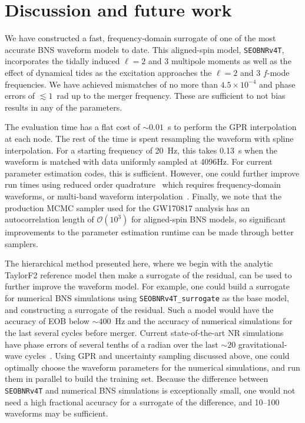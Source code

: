 \documentclass[prd,aps,letter,twocolumn,floatfix,notitlepage,nofootinbib]{revtex4-1}
\begin{document}
\section{Discussion and future work}
\label{sec:discussion}

We have constructed a fast, frequency-domain surrogate of one of the most accurate BNS waveform models to date. This aligned-spin model, \texttt{SEOBNRv4T}, incorporates the tidally induced $\ell=2$ and 3 multipole moments as well as the effect of dynamical tides as the excitation approaches the $\ell=2$ and 3 $f$-mode frequencies. We have achieved mismatches of no more than $4.5 \times 10^{-4}$ and phase errors of $\lesssim 1$~rad up to the merger frequency. These are sufficient to not bias results in any of the parameters.

The evaluation time has a flat cost of $\sim 0.01$~s to perform the GPR interpolation at each node. The rest of the time is spent resampling the waveform with spline interpolation. For a starting frequency of 20~Hz, this takes 0.13~s when the waveform is matched with data uniformly sampled at 4096Hz. For current parameter estimation codes, this is sufficient. However, one could further improve run times using reduced order quadrature~\cite{Antil2013, CanizaresFieldGair2013, CanizaresFieldGair2015, Smith:2016qas} which requires frequency-domain waveforms, or multi-band waveform interpolation~\cite{VinciguerraVeitchMandel2017}. Finally, we note that the production MCMC sampler used for the GW170817 analysis has an autocorrelation length of $\mathcal{O}(10^3)$ for aligned-spin BNS models, so significant improvements to the parameter estimation runtime can be made through better samplers. 

The hierarchical method presented here, where we begin with the analytic TaylorF2 reference model then make a surrogate of the residual, can be used to further improve the waveform model. For example, one could build a surrogate for numerical BNS simulations using \texttt{SEOBNRv4T\_surrogate} as the base model, and constructing a surrogate of the residual. Such a model would have the accuracy of EOB below $\sim 400$~Hz and the accuracy of numerical simulations for the last several cycles before merger. Current state-of-the-art NR simulations have phase errors of several tenths of a radian over the last $\sim 20$ gravitational-wave cycles~\cite{DietrichHinderer2017, KiuchiKawaguchiKyutoku2017}. Using GPR and uncertainty sampling discussed above, one could optimally choose the waveform parameters for the numerical simulations, and run them in parallel to build the training set. Because the difference between \texttt{SEOBNRv4T} and numerical BNS simulations is exceptionally small, one would not need a high fractional accuracy for a surrogate of the difference, and 10--100 waveforms may be sufficient.
\end{document}
